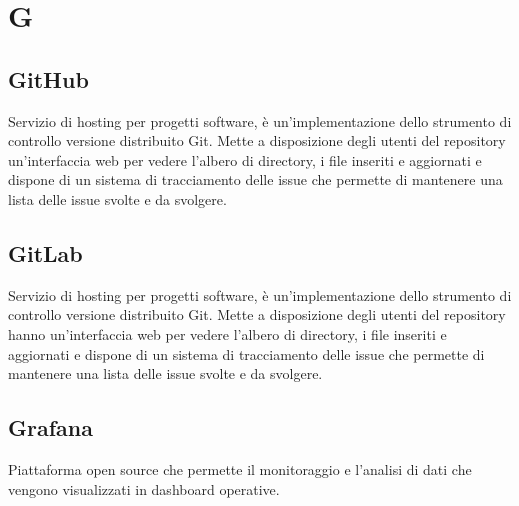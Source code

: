 \section*{G}

\subsection{GitHub}
Servizio di hosting per progetti software, è un'implementazione dello strumento di controllo versione distribuito Git. Mette a disposizione degli utenti del repository un'interfaccia web per vedere l'albero di directory, i file inseriti e aggiornati e dispone di un sistema di tracciamento delle issue che permette di mantenere una lista delle issue svolte e da svolgere.

\subsection{GitLab}
Servizio di hosting per progetti software, è un'implementazione dello strumento di controllo versione distribuito Git. Mette a disposizione degli utenti del repository hanno un'interfaccia web per vedere l'albero di directory, i file inseriti e aggiornati e dispone di un sistema di tracciamento delle issue che permette di mantenere una lista delle issue svolte e da svolgere.



\subsection{Grafana}
Piattaforma open source che permette il monitoraggio e l'analisi di dati che vengono visualizzati in dashboard operative. 